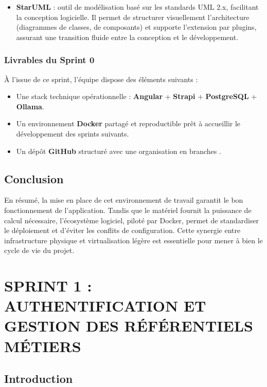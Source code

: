 \documentclass[12pt,a4paper,oneside]{report}
\begin{document}
\begin{itemize}
\begin{itemize}
    \item \textbf{StarUML} : outil de modélisation basé sur les standards UML 2.x, facilitant la conception logicielle. Il permet de structurer visuellement l'architecture (diagrammes de classes, de composants) et supporte l'extension par plugins, assurant une transition fluide entre la conception et le développement.
\end{itemize}

\subsection{Livrables du Sprint 0}

À l’issue de ce sprint, l’équipe dispose des éléments suivants :

\begin{itemize}
    \item Une stack technique opérationnelle : \textbf{Angular} + \textbf{Strapi} + \textbf{PostgreSQL} + \textbf{Ollama}.
    \item Un environnement \textbf{Docker} partagé et reproductible prêt à accueillir le développement des sprints suivants.
    \item Un dépôt \textbf{GitHub} structuré avec une organisation en branches .
    
\end{itemize}


\section*{Conclusion}
En résumé, la mise en place de cet environnement de travail garantit le bon fonctionnement de l’application. Tandis que le matériel fournit la puissance de calcul nécessaire, l’écosystème logiciel, piloté par Docker, permet de standardiser le déploiement et d’éviter les conflits de configuration. Cette synergie entre infrastructure physique et virtualisation légère est essentielle pour mener à bien le cycle de vie du projet.
\chapter{SPRINT 1 : AUTHENTIFICATION ET GESTION DES RÉFÉRENTIELS MÉTIERS}

\section*{Introduction}


\end{itemize}
\end{document}
